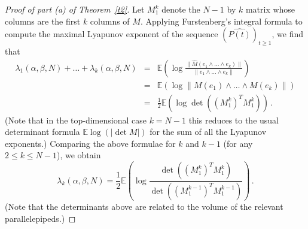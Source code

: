 \documentclass[12pt]{article}
\newcommand{\1}{\mathbf{1}}
\begin{document}
\begin{proof}[Proof of part (a) of Theorem~\ref{t2}]
 Let $M_1^k$ denote the $N-1$ by $k$ matrix whose columns are the first $k$ columns of $M$. Applying Furstenberg's integral formula to compute the maximal Lyapunov exponent of the sequence $\left(\widehat{P(t)}\right)_{t \ge 1}$, we find that 
\begin{eqnarray*} 
\lambda_1(\alpha,\beta,N) + \dots + \lambda_k(\alpha,\beta,N) & = & \mathbb{E}\left(\log \frac{\|\hat{M}(e_1 \wedge \dots \wedge e_k)\|}{\|e_1 \wedge \dots \wedge e_k\|}\right)\\ & = &  \mathbb{E}\left(\log \|M(e_1 )\wedge \dots \wedge M(e_k)\|\right)\\ 
 & = & \frac{1}{2} \mathbb{E}\left(\log \det \left(\left(M_1^k\right)^T M_1^k \right)\right)\,. 
\end{eqnarray*}
  (Note that in the top-dimensional case $k=N-1$ this reduces to the usual determinant formula $\mathbb{E} \log (|\det M|)$ for the sum of all the Lyapunov exponents.) Comparing the above formulae for $k$ and $k-1$ (for any $2 \le k \le N-1$), we obtain
\begin{equation}\label{E: matrix expression for lambda k}
 \lambda_k(\alpha,\beta,N) = \frac{1}{2} \mathbb{E}\left(\log \frac{\det \left(\left(M_1^k\right)^T M_1^k\right)}{\det \left(\left(M_1^{k-1}\right)^T M_1^{k-1} \right) }\right)\,. 
\end{equation}
(Note that the determinants above are related to the volume of the relevant parallelepipeds.)


\end{proof}
\end{document}
